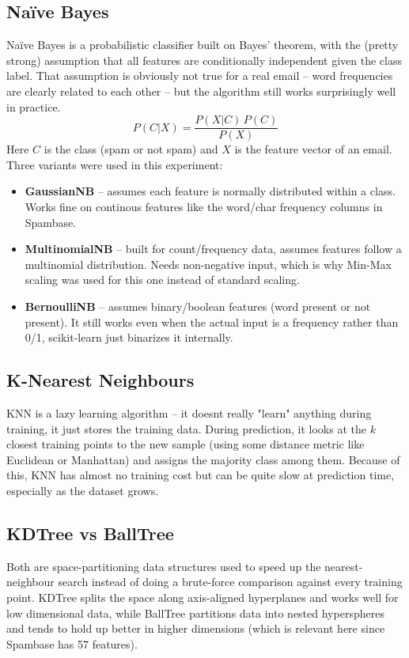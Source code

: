 \documentclass[12pt,a4paper]{article}
\begin{document}
\subsection*{Na\"ive Bayes}
Na\"ive Bayes is a probabilistic classifier built on Bayes' theorem, with the (pretty strong) assumption that all features are conditionally independent given the class label. That assumption is obviously not true for a real email -- word frequencies are clearly related to each other -- but the algorithm still works surprisingly well in practice.
\[
P(C|X) = \frac{P(X|C)\,P(C)}{P(X)}
\]
Here $C$ is the class (spam or not spam) and $X$ is the feature vector of an email. Three variants were used in this experiment:
\begin{itemize}
\item \textbf{GaussianNB} -- assumes each feature is normally distributed within a class. Works fine on continous features like the word/char frequency columns in Spambase.
\item \textbf{MultinomialNB} -- built for count/frequency data, assumes features follow a multinomial distribution. Needs non-negative input, which is why Min-Max scaling was used for this one instead of standard scaling.
\item \textbf{BernoulliNB} -- assumes binary/boolean features (word present or not present). It still works even when the actual input is a frequency rather than 0/1, scikit-learn just binarizes it internally.
\end{itemize}

\subsection*{K-Nearest Neighbours}
KNN is a lazy learning algorithm -- it doesnt really "learn" anything during training, it just stores the training data. During prediction, it looks at the $k$ closest training points to the new sample (using some distance metric like Euclidean or Manhattan) and assigns the majority class among them. Because of this, KNN has almost no training cost but can be quite slow at prediction time, especially as the dataset grows.

\subsection*{KDTree vs BallTree}
Both are space-partitioning data structures used to speed up the nearest-neighbour search instead of doing a brute-force comparison against every training point. KDTree splits the space along axis-aligned hyperplanes and works well for low dimensional data, while BallTree partitions data into nested hyperspheres and tends to hold up better in higher dimensions (which is relevant here since Spambase has 57 features).
\end{document}
